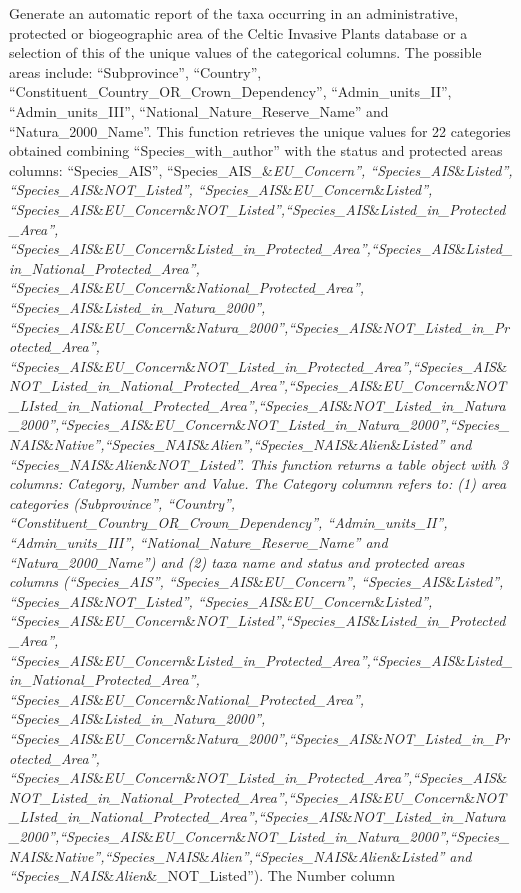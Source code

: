 \documentclass[
]{article}
\begin{document}
Generate an automatic report of the taxa occurring in an administrative,
protected or biogeographic area of the Celtic Invasive Plants database
or a selection of this of the unique values of the categorical columns.
The possible areas include: ``Subprovince'', ``Country'',
``Constituent\_Country\_OR\_Crown\_Dependency'', ``Admin\_units\_II'',
``Admin\_units\_III'', ``National\_Nature\_Reserve\_Name'' and
``Natura\_2000\_Name''. This function retrieves the unique values for 22
categories obtained combining ``Species\_with\_author'' with the status
and protected areas columns: ``Species\_AIS'',
``Species\_AIS\_\&\emph{EU\_Concern'', ``Species\_AIS}\&\emph{Listed'',
``Species\_AIS}\&\emph{NOT\_Listed'',
``Species\_AIS}\&\emph{EU\_Concern}\&\emph{Listed'',
``Species\_AIS}\&\emph{EU\_Concern}\&\emph{NOT\_Listed'',``Species\_AIS}\&\emph{Listed\_in\_Protected\_Area'',
``Species\_AIS}\&\emph{EU\_Concern}\&\emph{Listed\_in\_Protected\_Area'',``Species\_AIS}\&\emph{Listed\_in\_National\_Protected\_Area'',
``Species\_AIS}\&\emph{EU\_Concern}\&\emph{National\_Protected\_Area'',
``Species\_AIS}\&\emph{Listed\_in\_Natura\_2000'',
``Species\_AIS}\&\emph{EU\_Concern}\&\emph{Natura\_2000'',``Species\_AIS}\&\emph{NOT\_Listed\_in\_Protected\_Area'',
``Species\_AIS}\&\emph{EU\_Concern}\&\emph{NOT\_Listed\_in\_Protected\_Area'',``Species\_AIS}\&\emph{NOT\_Listed\_in\_National\_Protected\_Area'',``Species\_AIS}\&\emph{EU\_Concern}\&\emph{NOT\_LIsted\_in\_National\_Protected\_Area'',``Species\_AIS}\&\emph{NOT\_Listed\_in\_Natura\_2000'',``Species\_AIS}\&\emph{EU\_Concern}\&\emph{NOT\_Listed\_in\_Natura\_2000'',``Species\_NAIS}\&\emph{Native'',``Species\_NAIS}\&\emph{Alien'',``Species\_NAIS}\&\emph{Alien}\&\emph{Listed''
and ``Species\_NAIS}\&\emph{Alien}\&\emph{NOT\_Listed''. This function
returns a table object with 3 columns: Category, Number and Value. The
Category columnn refers to: (1) area categories (Subprovince'',
``Country'', ``Constituent\_Country\_OR\_Crown\_Dependency'',
``Admin\_units\_II'', ``Admin\_units\_III'',
``National\_Nature\_Reserve\_Name'' and ``Natura\_2000\_Name'') and (2)
taxa name and status and protected areas columns (``Species\_AIS'',
``Species\_AIS}\&\emph{EU\_Concern'', ``Species\_AIS}\&\emph{Listed'',
``Species\_AIS}\&\emph{NOT\_Listed'',
``Species\_AIS}\&\emph{EU\_Concern}\&\emph{Listed'',
``Species\_AIS}\&\emph{EU\_Concern}\&\emph{NOT\_Listed'',``Species\_AIS}\&\emph{Listed\_in\_Protected\_Area'',
``Species\_AIS}\&\emph{EU\_Concern}\&\emph{Listed\_in\_Protected\_Area'',``Species\_AIS}\&\emph{Listed\_in\_National\_Protected\_Area'',
``Species\_AIS}\&\emph{EU\_Concern}\&\emph{National\_Protected\_Area'',
``Species\_AIS}\&\emph{Listed\_in\_Natura\_2000'',
``Species\_AIS}\&\emph{EU\_Concern}\&\emph{Natura\_2000'',``Species\_AIS}\&\emph{NOT\_Listed\_in\_Protected\_Area'',
``Species\_AIS}\&\emph{EU\_Concern}\&\emph{NOT\_Listed\_in\_Protected\_Area'',``Species\_AIS}\&\emph{NOT\_Listed\_in\_National\_Protected\_Area'',``Species\_AIS}\&\emph{EU\_Concern}\&\emph{NOT\_LIsted\_in\_National\_Protected\_Area'',``Species\_AIS}\&\emph{NOT\_Listed\_in\_Natura\_2000'',``Species\_AIS}\&\emph{EU\_Concern}\&\emph{NOT\_Listed\_in\_Natura\_2000'',``Species\_NAIS}\&\emph{Native'',``Species\_NAIS}\&\emph{Alien'',``Species\_NAIS}\&\emph{Alien}\&\emph{Listed''
and ``Species\_NAIS}\&\emph{Alien}\&\_NOT\_Listed''). The Number column
\end{document}
